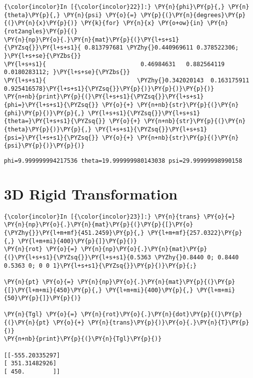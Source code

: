\documentclass[a4paper]{scrreprt}
\begin{document}
\begin{Verbatim}[commandchars=\\\{\}]
{\color{incolor}In [{\color{incolor}22}]:} \PY{n}{phi}\PY{p}{,} \PY{n}{theta}\PY{p}{,} \PY{n}{psi} \PY{o}{=} \PY{p}{(}\PY{n}{degrees}\PY{p}{(}\PY{n}{x}\PY{p}{)} \PY{k}{for} \PY{n}{x} \PY{o+ow}{in} \PY{n}{rot2angles}\PY{p}{(}
\PY{n}{np}\PY{o}{.}\PY{n}{mat}\PY{p}{(}\PY{l+s+s1}{\PYZsq{}}\PY{l+s+s1}{ 0.813797681 \PYZhy{}0.440969611 0.378522306;  }\PY{l+s+se}{\PYZbs{}}
\PY{l+s+s1}{                           0.46984631   0.882564119 0.0180283112; }\PY{l+s+se}{\PYZbs{}}
\PY{l+s+s1}{                          \PYZhy{}0.342020143  0.163175911 0.925416578}\PY{l+s+s1}{\PYZsq{}}\PY{p}{)}\PY{p}{)}\PY{p}{)}
\PY{n+nb}{print}\PY{p}{(}\PY{l+s+s1}{\PYZsq{}}\PY{l+s+s1}{phi=}\PY{l+s+s1}{\PYZsq{}} \PY{o}{+} \PY{n+nb}{str}\PY{p}{(}\PY{n}{phi}\PY{p}{)}\PY{p}{,} \PY{l+s+s1}{\PYZsq{}}\PY{l+s+s1}{theta=}\PY{l+s+s1}{\PYZsq{}} \PY{o}{+} \PY{n+nb}{str}\PY{p}{(}\PY{n}{theta}\PY{p}{)}\PY{p}{,} \PY{l+s+s1}{\PYZsq{}}\PY{l+s+s1}{psi=}\PY{l+s+s1}{\PYZsq{}} \PY{o}{+} \PY{n+nb}{str}\PY{p}{(}\PY{n}{psi}\PY{p}{)}\PY{p}{)}
\end{Verbatim}


\begin{Verbatim}[commandchars=\\\{\}]
phi=9.999999994217536 theta=19.999999980143038 psi=29.99999998990158

\end{Verbatim}

\section{3D Rigid Transformation}\label{d-rigid-transformation}

\begin{Verbatim}[commandchars=\\\{\},samepage=true]
{\color{incolor}In [{\color{incolor}23}]:} \PY{n}{trans} \PY{o}{=} \PY{n}{np}\PY{o}{.}\PY{n}{mat}\PY{p}{(}\PY{p}{[}\PY{o}{\PYZhy{}}\PY{l+m+mf}{451.2459}\PY{p}{,} \PY{l+m+mf}{257.0322}\PY{p}{,} \PY{l+m+mi}{400}\PY{p}{]}\PY{p}{)}
\PY{n}{rot} \PY{o}{=} \PY{n}{np}\PY{o}{.}\PY{n}{mat}\PY{p}{(}\PY{l+s+s1}{\PYZsq{}}\PY{l+s+s1}{0.5363 \PYZhy{}0.8440 0; 0.8440 0.5363 0; 0 0 1}\PY{l+s+s1}{\PYZsq{}}\PY{p}{)}\PY{p}{;} 

\PY{n}{pt} \PY{o}{=} \PY{n}{np}\PY{o}{.}\PY{n}{mat}\PY{p}{(}\PY{p}{[}\PY{l+m+mi}{450}\PY{p}{,} \PY{l+m+mi}{400}\PY{p}{,} \PY{l+m+mi}{50}\PY{p}{]}\PY{p}{)}

\PY{n}{Tgl} \PY{o}{=} \PY{n}{rot}\PY{o}{.}\PY{n}{dot}\PY{p}{(}\PY{p}{(}\PY{n}{pt} \PY{o}{+} \PY{n}{trans}\PY{p}{)}\PY{o}{.}\PY{n}{T}\PY{p}{)}
\PY{n+nb}{print}\PY{p}{(}\PY{n}{Tgl}\PY{p}{)}

[[-555.20335297]
[ 351.31482926]
[ 450.        ]]

\end{Verbatim}
\end{document}
